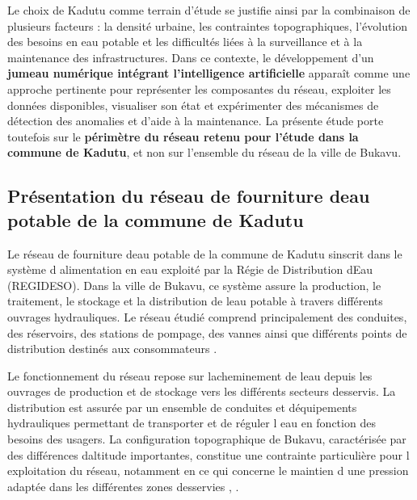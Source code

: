 Le choix de Kadutu comme terrain d'étude se justifie ainsi par la
combinaison de plusieurs facteurs : la densité urbaine, les contraintes
topographiques, l'évolution des besoins en eau potable et les difficultés
liées à la surveillance et à la maintenance des infrastructures. Dans
ce contexte, le développement d'un \textbf{jumeau numérique intégrant
	l'intelligence artificielle} apparaît comme une approche pertinente pour
représenter les composantes du réseau, exploiter les données disponibles,
visualiser son état et expérimenter des mécanismes de détection des
anomalies et d'aide à la maintenance. La présente étude porte toutefois
sur le \textbf{périmètre du réseau retenu pour l'étude dans la commune
	de Kadutu}, et non sur l'ensemble du réseau de la ville de Bukavu.

\subsection{Présentation du réseau de fourniture d\textquotesingle eau potable de la commune de Kadutu}
\label{presentation-du-reseau-de-fourniture-deau-potable-de-la-commune-de-kadutu}

Le réseau de fourniture d\textquotesingle eau potable de la commune de
Kadutu s\textquotesingle inscrit dans le système d\textquotesingle
alimentation en eau exploité par la Régie de Distribution
d\textquotesingle Eau (REGIDESO). Dans la ville de Bukavu, ce système
assure la production, le traitement, le stockage et la distribution de
l\textquotesingle eau potable à travers différents ouvrages hydrauliques.
Le réseau étudié comprend principalement des conduites, des réservoirs,
des stations de pompage, des vannes ainsi que différents points de
distribution destinés aux consommateurs \cite{ref86}.

Le fonctionnement du réseau repose sur l\textquotesingle acheminement
de l\textquotesingle eau depuis les ouvrages de production et de
stockage vers les différents secteurs desservis. La distribution est
assurée par un ensemble de conduites et d\textquotesingle équipements
hydrauliques permettant de transporter et de réguler l\textquotesingle
eau en fonction des besoins des usagers. La configuration topographique
de Bukavu, caractérisée par des différences d\textquotesingle altitude
importantes, constitue une contrainte particulière pour l\textquotesingle
exploitation du réseau, notamment en ce qui concerne le maintien d\textquotesingle
une pression adaptée dans les différentes zones desservies \cite{ref4},
\cite{ref34}.

